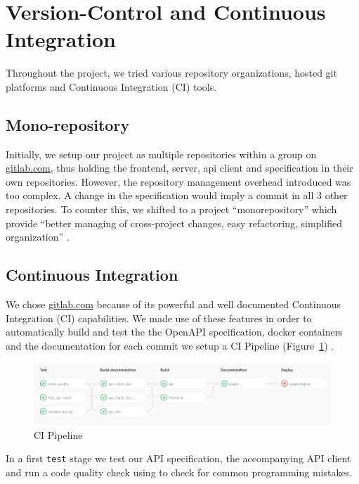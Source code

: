 \documentclass[\version]{l4proj}
\begin{document}
\section{Version-Control and Continuous Integration}

Throughout the project, we tried various repository organizations, hosted git platforms and Continuous Integration (CI) tools.

\subsection{Mono-repository}

Initially, we setup our project as multiple repositories within a group on \href{https://gitlab.com/harpocrates-app}{gitlab.com}, thus holding the frontend, server, api client and specification in their own repositories.
However, the repository management overhead introduced was too complex. A change in the specification would imply a commit in all 3 other repositories.
To counter this, we shifted to a project ``monorepository'' which provide ``better managing of cross-project changes, easy refactoring, simplified organization'' \autocite[1]{britoMonoreposMultivocalLiterature2018}.

\subsection{Continuous Integration}

We chose \href{https://gitlab.com/}{gitlab.com} because of its powerful and well documented Continuous Integration (CI) capabilities.
We made use of these features in order to automatically build and test the the OpenAPI specification, docker containers and the documentation for each commit we setup a CI Pipeline (Figure~\ref{fig:ci}) .

\begin{figure}[H]
    \centering
    \includegraphics[width=0.9\linewidth]{figures/ci.png}
    \caption{CI Pipeline}\label{fig:ci}
\end{figure}

In a first \verb|test| stage we test our API specification, the accompanying API client and run a code quality check using \textcite{Codeclimate2020} to check for common programming mistakes.
\end{document}
